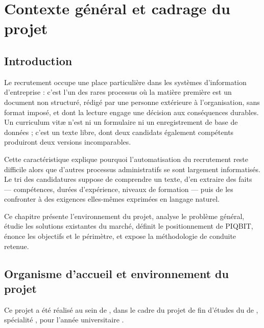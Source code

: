 %
\chapter{Contexte général et cadrage du projet}
\label{chap:context}

\section{Introduction}
\label{sec:ctx_intro}

Le recrutement occupe une place particulière dans les systèmes d'information
d'entreprise : c'est l'un des rares processus où la matière première est un
document non structuré, rédigé par une personne extérieure à l'organisation,
sans format imposé, et dont la lecture engage une décision aux conséquences
durables. Un curriculum vitæ n'est ni un formulaire ni un enregistrement de
base de données ; c'est un texte libre, dont deux candidats également
compétents produiront deux versions incomparables.

Cette caractéristique explique pourquoi l'automatisation du recrutement reste
difficile alors que d'autres processus administratifs se sont largement
informatisés. Le tri des candidatures suppose de comprendre un texte, d'en
extraire des faits — compétences, durées d'expérience, niveaux de formation —
puis de les confronter à des exigences elles-mêmes exprimées en langage
naturel.

Ce chapitre présente l'environnement du projet, analyse le problème général,
étudie les solutions existantes du marché, définit le positionnement de
PIQBIT, énonce les objectifs et le périmètre, et expose la méthodologie de
conduite retenue.

\section{Organisme d'accueil et environnement du projet}
\label{sec:host_organization}

Ce projet a été réalisé au sein de \reportHostOrg, dans le cadre du projet de
fin d'études du \reportDegree{} de \reportInstitution, spécialité
\reportSpecialty, pour l'année universitaire \reportAcademicYear.

